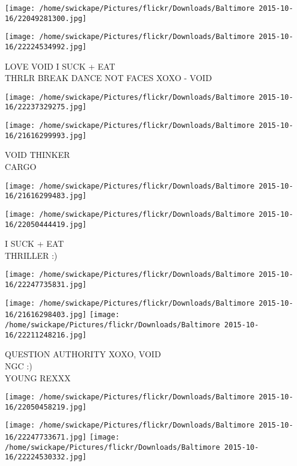 \documentclass[10pt,letterpaper]{article}
\begin{document}
\texttt{[image: /home/swickape/Pictures/flickr/Downloads/Baltimore 2015-10-16/22049281300.jpg]}

\vspace{0.25in}
\texttt{[image: /home/swickape/Pictures/flickr/Downloads/Baltimore 2015-10-16/22224534992.jpg]}

LOVE VOID I SUCK + EAT\\
THRLR BREAK DANCE NOT FACES XOXO {-} VOID\\
\pagebreak

\texttt{[image: /home/swickape/Pictures/flickr/Downloads/Baltimore 2015-10-16/22237329275.jpg]}

\vspace{0.25in}
\texttt{[image: /home/swickape/Pictures/flickr/Downloads/Baltimore 2015-10-16/21616299993.jpg]}

VOID THINKER\\
CARGO\\
\pagebreak

\texttt{[image: /home/swickape/Pictures/flickr/Downloads/Baltimore 2015-10-16/21616299483.jpg]}

\vspace{0.25in}
\texttt{[image: /home/swickape/Pictures/flickr/Downloads/Baltimore 2015-10-16/22050444419.jpg]}

I SUCK + EAT\\
THRILLER :)\\
\pagebreak

\texttt{[image: /home/swickape/Pictures/flickr/Downloads/Baltimore 2015-10-16/22247735831.jpg]}

\vspace{0.25in}
\texttt{[image: /home/swickape/Pictures/flickr/Downloads/Baltimore 2015-10-16/21616298403.jpg]}
\texttt{[image: /home/swickape/Pictures/flickr/Downloads/Baltimore 2015-10-16/22211248216.jpg]}

QUESTION AUTHORITY XOXO, VOID\\
NGC :)\\
YOUNG REXXX\\
\pagebreak

\texttt{[image: /home/swickape/Pictures/flickr/Downloads/Baltimore 2015-10-16/22050458219.jpg]}

\vspace{0.25in}
\texttt{[image: /home/swickape/Pictures/flickr/Downloads/Baltimore 2015-10-16/22247733671.jpg]}
\texttt{[image: /home/swickape/Pictures/flickr/Downloads/Baltimore 2015-10-16/22224530332.jpg]}
\end{document}
